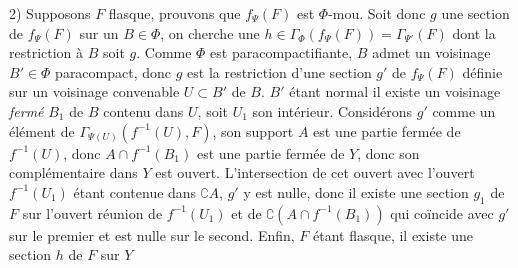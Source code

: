 2) Supposons $F$ flasque, prouvons que $f_\Psi(F)$ est $\Phi$-mou. Soit donc
$g$ une section de $f_\Psi(F)$ sur un $B\in\Phi$, on cherche une
$h\in\Gamma_\Phi(f_\Psi(F))=\Gamma_{\Psi'}(F)$ dont la restriction à $B$
soit $g$. Comme $\Phi$ est paracompactifiante, $B$ admet un voisinage
$B'\in\Phi$ paracompact, donc $g$ est la restriction d'une section $g'$ de
$f_\Psi(F)$ définie sur un voisinage convenable $U\subset B'$ de $B$. $B'$
étant normal il existe un voisinage \textit{fermé} $B_1$ de $B$ contenu dans
$U$, soit $U_1$ son intérieur.
Considérons $g'$ comme un élément de
$\Gamma_{\Psi(U)}(f^{-1}(U),F)$, son support $A$ est une partie fermée de
$f^{-1}(U)$, donc $A\cap f^{-1}(B_1)$ est une partie fermée de $Y$, donc son
complémentaire dans $Y$ est ouvert. L'intersection de cet ouvert avec l'ouvert
$f^{-1}(U_1)$ étant contenue dans $\complement A$, $g'$ y est nulle, donc il
existe une section $g_1$ de $F$ sur l'ouvert réunion de $f^{-1}(U_1)$ et de
$\complement(A\cap f^{-1}(B_1))$ qui coïncide avec $g'$ sur le premier et est
nulle sur le second. Enfin, $F$ étant flasque, il existe une section $h$ de
$F$ sur $Y$


